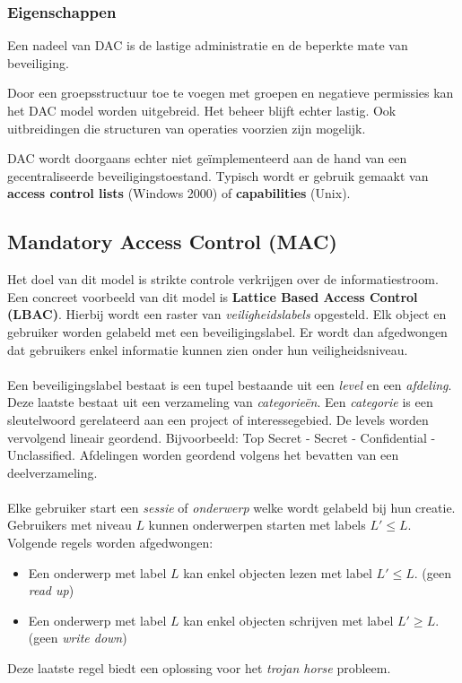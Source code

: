 \documentclass[../main.tex]{subfiles}
\begin{document}
\subsubsection{Eigenschappen}
Een nadeel van DAC is de lastige administratie en de beperkte mate van beveiliging.

Door een groepsstructuur toe te voegen met groepen en negatieve permissies kan het DAC model worden uitgebreid. Het beheer blijft echter lastig. Ook uitbreidingen die structuren van operaties voorzien zijn mogelijk.

DAC wordt doorgaans echter niet ge\"implementeerd aan de hand van een gecentraliseerde beveiligingstoestand. Typisch wordt er gebruik gemaakt van \textbf{access control lists} (Windows 2000) of \textbf{capabilities} (Unix).

\subsection{Mandatory Access Control (MAC)}
Het doel van dit model is strikte controle verkrijgen over de informatiestroom. Een concreet voorbeeld van dit model is \textbf{Lattice Based Access Control (LBAC)}. Hierbij wordt een raster van \textit{veiligheidslabels} opgesteld. Elk object en gebruiker worden gelabeld met een beveiligingslabel. Er wordt dan afgedwongen dat gebruikers enkel informatie kunnen zien onder hun veiligheidsniveau. 
\\\\
Een beveiligingslabel bestaat is een tupel bestaande uit een \textit{level} en een \textit{afdeling}. Deze laatste bestaat uit een verzameling van \textit{categorie\"en}. Een \textit{categorie} is een sleutelwoord gerelateerd aan een project of interessegebied. De levels worden vervolgend lineair geordend. Bijvoorbeeld: Top Secret - Secret - Confidential - Unclassified. Afdelingen worden geordend volgens het bevatten van een deelverzameling.
\\\\
Elke gebruiker start een \textit{sessie} of \textit{onderwerp} welke wordt gelabeld bij hun creatie. Gebruikers met niveau $L$ kunnen onderwerpen starten met labels $L' \leq L$.  Volgende regels worden afgedwongen:
\begin{itemize}
	\item Een onderwerp met label $L$ kan enkel objecten lezen met label $L' \leq L$. (geen \textit{read up})
	\item Een onderwerp met label $L$ kan enkel objecten schrijven met label $L' \geq L$. (geen \textit{write down})
\end{itemize}
Deze laatste regel biedt een oplossing voor het \textit{trojan horse} probleem.
\end{document}
